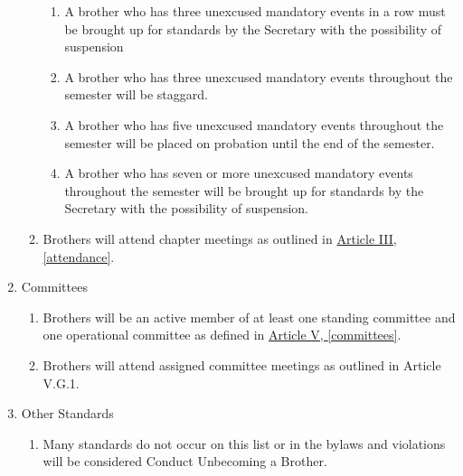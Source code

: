 \begin{enumerate}
\begin{enumerate}
\begin{enumerate}
					\item A brother who has three unexcused mandatory events in a row must be brought up for standards by the Secretary with the possibility of suspension

					\item A brother who has three unexcused mandatory events throughout the semester will be staggard.

					\item A brother who has five unexcused mandatory events throughout the semester will be placed on probation until the end of the semester.

					\item A brother who has seven or more unexcused mandatory events throughout the semester will be brought up for standards by the Secretary with the possibility of suspension.
				\end{enumerate}

			\item Brothers will attend chapter meetings as outlined in \hyperref[attendance]{Article III, \autoref*{attendance}}.
		\end{enumerate}
	
	\item Committees
		\begin{enumerate}
			\item Brothers will be an active member of at least one standing committee and one operational committee as defined in \hyperref[committees]{Article V, \autoref*{committees}}.
            \item Brothers will attend assigned committee meetings as outlined in Article V.G.1.
		\end{enumerate}

	\item Other Standards 
		\begin{enumerate}
			\item Many standards do not occur on this list or in the bylaws and  violations will be considered Conduct Unbecoming a Brother. 
		\end{enumerate}
	\end{enumerate}
